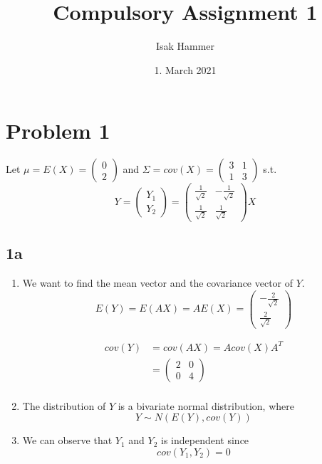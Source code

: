 \documentclass{article}
\title{Compulsory Assignment 1}
\author{Isak Hammer }
\date{1. March 2021}
\theoremstyle{remark}
\begin{document}
\maketitle
\newpage

\newpage
\section*{Problem 1}%
\label{sec:problem_1}

Let $\mu = E\left( X \right) = \begin{pmatrix}
0 \\
2
\end{pmatrix}
$
and $\Sigma  = cov \left( X \right) = \begin{pmatrix}
3 & 1 \\
1 & 3
\end{pmatrix}
$
s.t. \[
Y = \begin{pmatrix}
Y_{1} \\
Y_{2}
\end{pmatrix}
= \begin{pmatrix}
\frac{1}{\sqrt{2} } & -  \frac{1}{\sqrt{2} } \\
\frac{1}{\sqrt{2} } &  \frac{1}{\sqrt{2} }
\end{pmatrix}X
\]

\subsection*{ 1a}%
\label{sub:_a}

\begin{enumerate}[label=(\roman*)]
    \item We want to find the mean vector and the covariance vector of $Y$.
        \[
        E\left( Y \right) = E\left( AX \right) = AE\left( X \right) = \begin{pmatrix}
    -\frac{2}{\sqrt{2} } \\
    \frac{2}{\sqrt{2} }
    \end{pmatrix}
        \]

    \[
        \begin{split}
        cov\left( Y \right)  &=  cov \left( AX \right) = A cov\left( X \right) A^{T} \\
        &=  \begin{pmatrix}
        2 & 0 \\
        0 & 4
        \end{pmatrix}
         \\
        \end{split}
    \]
\item The distribution of $Y$ is a bivariate normal distribution, where \[
Y \sim  N\left( E\left( Y \right), cov\left( Y \right) \right)
\]
\item We can observe that $Y_{1}$ and $Y_{2}$  is independent since \[
cov \left( Y_{1}, Y_{2} \right) = 0
\]
\end{enumerate}
\end{document}
